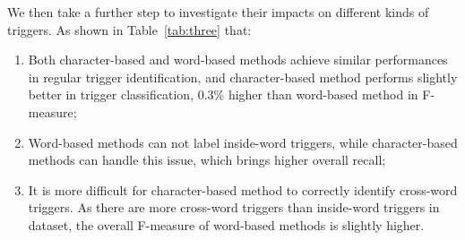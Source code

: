 We then take a further step to investigate their impacts on different kinds of triggers. As shown in Table~\ref{tab:three} that:

\begin{enumerate}
	\item Both character-based and word-based methods achieve similar performances in regular trigger identification, and character-based method performs slightly better in trigger classification, 0.3\% higher than word-based method in F-measure;
	\item Word-based methods can not label inside-word triggers, while character-based methods can handle this issue, which brings higher overall recall;
	\item It is more difficult for character-based method to correctly identify cross-word triggers. As there are more cross-word triggers than inside-word triggers in dataset, the overall F-measure of word-based methods is slightly higher.
\end{enumerate}

\begin{table}
\newcommand{\tabincell}[2]{\begin{tabular}{@{}#1@{}}#2\end{tabular}}
\end{table}

